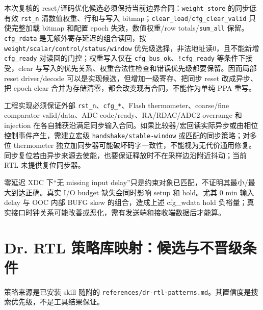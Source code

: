 \documentclass[UTF8,fontset=fandol,10pt,a4paper,openany]{ctexrep}
\newcommand{\code}[1]{\nolinkurl{#1}}
\begin{document}
本次复核的 reset/译码优化候选必须保持当前边界合同：\code{weight_store} 的同步低有效 \code{rst_n} 清数值权重、行和与写入 bitmap；\code{clear_load}/\code{cfg_clear_valid} 只使完整加载 bitmap 和配置 epoch 失效，数值权重/row totals/\code{sum_all} 保留。\code{cfg_rdata} 是无额外寄存延迟的组合读回，按 \code{weight/scalar/control/status/window} 优先级选择，非法地址读0，且不能新增 \code{cfg_ready} 对读回的门控；权重写入仅在 \code{cfg_bus_ok}、\code{!cfg_ready} 等条件下接受，clear 与写入的优先关系、权重合法性检查和错误优先级都要保留。因而局部 reset driver/decode 可以是实现候选，但增加一级寄存、把同步 reset 改成异步、把 epoch clear 合并为存储清零，都会改变现有合同，不能作为单纯 PPA 重写。


工程实现必须保证外部 \code{rst_n}、\code{cfg_*}、Flash thermometer、coarse/fine comparator valid/data、ADC code/ready、RA/RDAC/ADC2 overrange 和 injection 在各自捕获沿满足同步输入合同。如果比较器/宏回读实际异步或由相位控制事件产生，需建立宏级 \code{handshake/stable-window} 或匹配的同步策略；对多位 thermometer 独立加同步器可能破坏码字一致性，不能视为无代价通用修复。同步复位若由异步来源去使能，也要保证释放时不在采样边沿附近抖动；当前 RTL 未提供复位同步器。


零延迟 XDC 下“无 missing input delay”只是约束对象已匹配，不证明其最小/最大到达正确。真实 I/O budget 缺失会同时影响 setup 和 hold。尤其 0 min 输入 delay 与 OOC 内部 BUFG skew 的组合，造成上述 cfg\_wdata hold 负裕量；真实接口时钟关系可能改善或恶化，需有发送端和接收端数据后才能算。


\section{Dr. RTL 策略库映射：候选与不晋级条件}


策略来源是已安装 skill 随附的 \code{references/dr-rtl-patterns.md}。其置信度是搜索优先级，不是工具结果保证。
\end{document}
